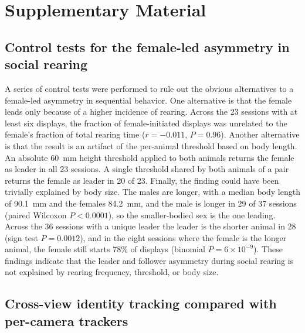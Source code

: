 \documentclass[pdflatex, sn-nature]{sn-jnl}
\theoremstyle{thmstyleone}%
\theoremstyle{thmstyletwo}%
\theoremstyle{thmstylethree}%
\begin{document}
\section{Supplementary Material}\label{sec5}

\setcounter{figure}{0}
\renewcommand{\figurename}{Supplementary Figure}

\subsection{Control tests for the female-led asymmetry in social rearing}\label{subsec-rearing-controls}

A series of control tests were performed to rule out the obvious alternatives to a female-led asymmetry in sequential behavior. One alternative is that the female leads only because of a higher incidence of rearing. Across the 23 sessions with at least six displays, the fraction of female-initiated displays was unrelated to the female's fraction of total rearing time ($r = -0.011$, $P = 0.96$). Another alternative is that the result is an artifact of the per-animal threshold based on body length. An absolute 60~mm height threshold applied to both animals returns the female as leader in all 23 sessions. A single threshold shared by both animals of a pair returns the female as leader in 20 of 23. Finally, the finding could have been trivially explained by body size. The males are longer, with a median body length of 90.1~mm and the females 84.2~mm, and the male is longer in 29 of 37 sessions (paired Wilcoxon $P < 0.0001$), so the smaller-bodied sex is the one leading. Across the 36 sessions with a unique leader the leader is the shorter animal in 28 (sign test $P = 0.0012$), and in the eight sessions where the female is the longer animal, the female still starts 78\% of displays (binomial $P = 6 \times 10^{-9}$). These findings indicate that the leader and follower asymmetry during social rearing is not explained by rearing frequency, threshold, or body size.

\subsection{Cross-view identity tracking compared with per-camera trackers}\label{subsec2-7}
\end{document}
